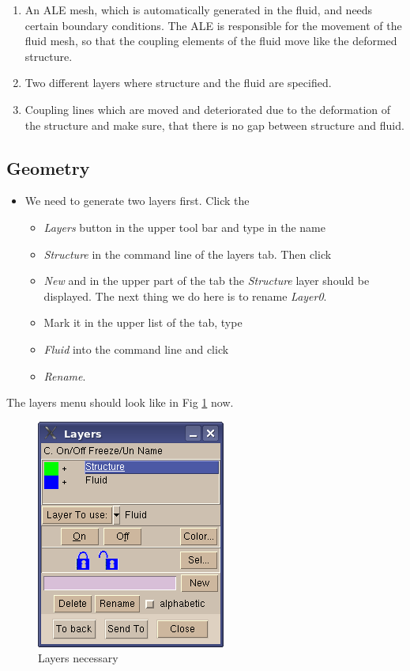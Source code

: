 \begin{enumerate}
\item An ALE mesh, which is automatically generated in the fluid, and needs
certain boundary conditions. The ALE is responsible for the movement
of the fluid mesh, so that the coupling elements of the fluid move
like the deformed structure.
\item Two different layers where structure and the fluid are specified.
\item Coupling lines which are moved and deteriorated due to the deformation
of the structure and make sure, that there is no gap between structure
and fluid.
\end{enumerate}

\subsection{Geometry}

\begin{itemize}
\item We need to generate two layers first. Click the

\begin{itemize}
\item \emph{Layers} button in the upper tool bar and type in the name
\item \emph{Structure} in the command line of the layers tab. Then click
\item \emph{New} and in the upper part of the tab the \emph{Structure} layer
should be displayed. The next thing we do here is to rename \emph{Layer0}.
\item Mark it in the upper list of the tab, type
\item \emph{Fluid} into the command line and click
\item \emph{Rename}.
\end{itemize}
\end{itemize}
The layers menu should look like in Fig \ref{tut_fsi:5.1} now.

%
\begin{figure}[h]
\includegraphics[scale=0.6]{Bilder/fsi_01}


\caption{\label{tut_fsi:5.1} Layers necessary}
\end{figure}


